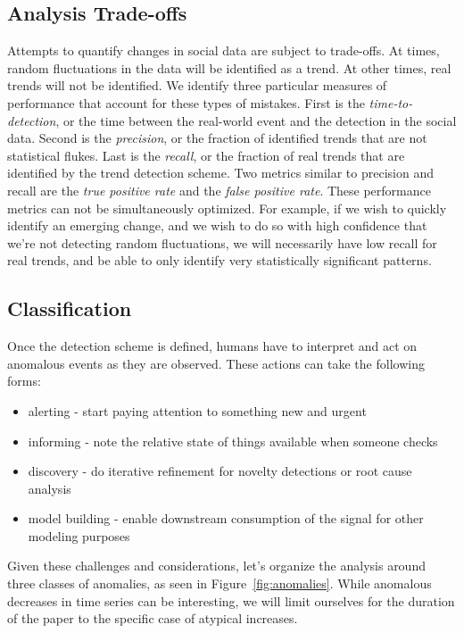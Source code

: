 \documentclass{article}
\begin{document}
\subsection{Analysis Trade-offs}
Attempts to quantify changes in social data are subject to trade-offs. 
At times, random fluctuations in the data will be identified as a trend.
At other times, real trends will not be identified. We identify three 
particular measures of performance that account for these types of mistakes.
First is the \textit{time-to-detection}, or the time between the
real-world event and the detection in the social data. 
Second is the \textit{precision}, or the fraction of identified trends 
that are not statistical flukes. 
Last is the \textit{recall}, or the fraction of real trends that are identified
by the trend detection scheme.
Two metrics similar to precision and recall are the \textit{true positive rate}
and the \textit{false positive rate}.
These performance metrics can not be simultaneously optimized.
For example, if we wish to quickly identify an
emerging change, and we wish to do so with high confidence that we’re not
detecting random fluctuations, we will necessarily have 
low recall for real trends, and be 
able to only identify very statistically significant patterns.

\subsection{Classification}
Once the detection scheme is defined, humans have to interpret
and act on anomalous events as they are observed. These actions can take the
following forms:

\begin{itemize} 
    \item alerting - start paying attention to something new and urgent 
    \item informing - note the relative state of things available when someone 
        checks 
    \item discovery - do iterative refinement for novelty detections or root 
        cause analysis 
    \item model building - enable downstream consumption of the signal for 
        other modeling purposes 
\end{itemize}

Given these challenges and considerations, let’s organize the analysis around
three classes of anomalies, as seen in Figure~\ref{fig:anomalies}. While
anomalous decreases in time series can be interesting, we will limit ourselves
for the duration of the paper to the specific case of atypical increases.
\end{document}
